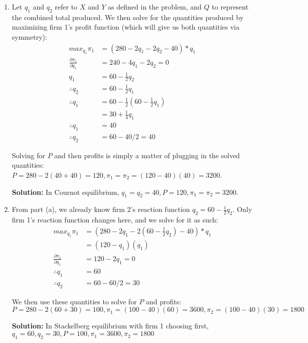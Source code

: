 \documentclass[12pt,letterpaper]{article}
\begin{document}
\begin{enumerate}
\begin{enumerate}
	\item Let $q_1$ and $q_2$ refer to $X$ and $Y$ as defined in the problem, and $Q$ to represent the combined total produced. We then solve for the quantities produced by maximizing firm 1's profit function (which will give us both quantities via symmetry):
	\begin{align*}
		max_{q_1} \pi_1 &= (280 - 2q_1 - 2q_2 - 40)*q_1 \\
		\frac{\partial\pi_1}{\partial q_1} &= 240 - 4q_1 - 2q_2 = 0 \\
		q_1 &= 60 - \frac{1}{2}q_2 \\
		\therefore q_2 &= 60 - \frac{1}{2}q_1 \\
		\therefore q_1 &= 60 - \frac{1}{2}(60 - \frac{1}{2}q_1) \\
		&= 30 + \frac{1}{4}q_1 \\
		\therefore q_1 &= 40 \\
		\therefore q_2 &= 60 - 40/2 = 40
	\end{align*}

	Solving for $P$ and then profits is simply a matter of plugging in the solved quantities: $P=280 - 2(40+40) = 120, \pi_1 = \pi_2 = (120-40)(40) = 3200$.

	{\color{blue} \textbf{Solution:} In Cournot equilibrium, $q_1 = q_2 = 40, P=120, \pi_1=\pi_2 = 3200$.}

	\item From part (a), we already know firm 2's reaction function $q_2 = 60 - \frac{1}{2}q_2$. Only firm 1's reaction function changes here, and we solve for it as such:
	\begin{align*}
		max_{q_1} \pi_1 &= (280 - 2q_1 - 2(60 - \frac{1}{2}q_2) - 40)*q_1 \\
		&= (120-q_1)(q_1) \\
		\frac{\partial\pi_1}{\partial q_1} &= 120 - 2q_1 = 0 \\
		\therefore q_1 &= 60 \\
		\therefore q_2 &= 60 - 60/2 = 30
	\end{align*}

	We then use these quantities to solve for $P$ and profits: $P = 280 - 2(60 + 30) = 100, \pi_1 = (100-40)(60) = 3600, \pi_2 = (100-40)(30) = 1800$

	{\color{blue}\textbf{Solution:} In Stackelberg equilibrium with firm 1 choosing first, $q_1 = 60, q_2 = 30, P = 100, \pi_1 = 3600, \pi_2 = 1800$}
\end{enumerate}


\end{enumerate}
	
\end{document}
